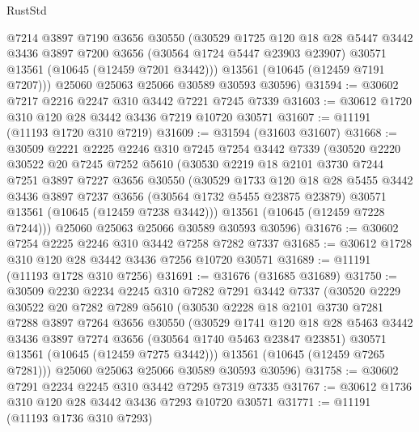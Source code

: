 \begin{lexlean}{RustStd}
\begin{coremodule}
        @7214
        @3897
        @7190
        @3656
        @30550
        (@30529
          @1725
          @120
          @18
          @28
          @5447
          @3442
          @3436
          @3897
          @7200
          @3656
          (@30564 @1724 @5447 @23903 @23907)
          @30571
          @13561
          (@10645 (@12459 @7201 @3442)))
        @13561
        (@10645 (@12459 @7191 @7207)))
      @25060
      @25063
      @25066
      @30589
      @30593
      @30596)
@31594 := @30602 @7217 @2216 @2247 @310 @3442 @7221 @7245 @7339
@31603 := @30612 @1720 @310 @120 @28 @3442 @3436 @7219 @10720 @30571
@31607 := @11191 (@11193 @1720 @310 @7219)
@31609 := @31594 (@31603 @31607)
@31668 := @30509
    @2221
    @2225
    @2246
    @310
    @7245
    @7254
    @3442
    @7339
    (@30520
      @2220
      @30522
      @20
      @7245
      @7252
      @5610
      (@30530
        @2219
        @18
        @2101
        @3730
        @7244
        @7251
        @3897
        @7227
        @3656
        @30550
        (@30529
          @1733
          @120
          @18
          @28
          @5455
          @3442
          @3436
          @3897
          @7237
          @3656
          (@30564 @1732 @5455 @23875 @23879)
          @30571
          @13561
          (@10645 (@12459 @7238 @3442)))
        @13561
        (@10645 (@12459 @7228 @7244)))
      @25060
      @25063
      @25066
      @30589
      @30593
      @30596)
@31676 := @30602 @7254 @2225 @2246 @310 @3442 @7258 @7282 @7337
@31685 := @30612 @1728 @310 @120 @28 @3442 @3436 @7256 @10720 @30571
@31689 := @11191 (@11193 @1728 @310 @7256)
@31691 := @31676 (@31685 @31689)
@31750 := @30509
    @2230
    @2234
    @2245
    @310
    @7282
    @7291
    @3442
    @7337
    (@30520
      @2229
      @30522
      @20
      @7282
      @7289
      @5610
      (@30530
        @2228
        @18
        @2101
        @3730
        @7281
        @7288
        @3897
        @7264
        @3656
        @30550
        (@30529
          @1741
          @120
          @18
          @28
          @5463
          @3442
          @3436
          @3897
          @7274
          @3656
          (@30564 @1740 @5463 @23847 @23851)
          @30571
          @13561
          (@10645 (@12459 @7275 @3442)))
        @13561
        (@10645 (@12459 @7265 @7281)))
      @25060
      @25063
      @25066
      @30589
      @30593
      @30596)
@31758 := @30602 @7291 @2234 @2245 @310 @3442 @7295 @7319 @7335
@31767 := @30612 @1736 @310 @120 @28 @3442 @3436 @7293 @10720 @30571
@31771 := @11191 (@11193 @1736 @310 @7293)

\end{coremodule}
\end{lexlean}
